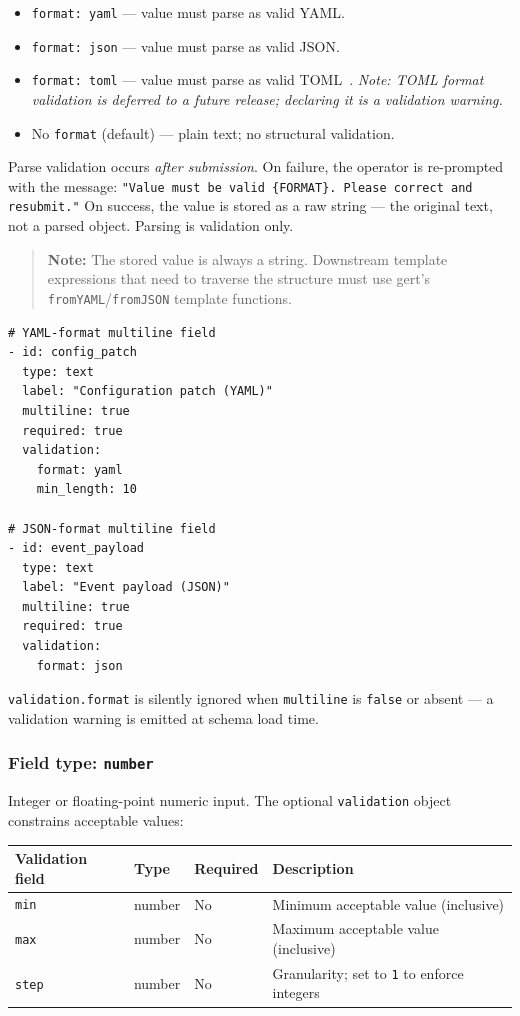 \begin{itemize}
  \item \texttt{format: yaml} — value must parse as valid YAML.
  \item \texttt{format: json} — value must parse as valid JSON.
  \item \texttt{format: toml} — value must parse as valid TOML~.
        \emph{Note: TOML format validation is deferred to a future release;
        declaring it is a validation warning.}
  \item No \texttt{format} (default) — plain text; no structural validation.
\end{itemize}

Parse validation occurs \emph{after submission}.  On failure, the operator
is re-prompted with the message:
\texttt{"Value must be valid \{FORMAT\}.  Please correct and resubmit."}
On success, the value is stored as a raw string — the original text, not a
parsed object.  Parsing is validation only.

\begin{quote}
\textbf{Note:} The stored value is always a string.  Downstream template
expressions that need to traverse the structure must use gert's
\texttt{fromYAML}/\texttt{fromJSON} template functions.
\end{quote}

\begin{verbatim}
# YAML-format multiline field
- id: config_patch
  type: text
  label: "Configuration patch (YAML)"
  multiline: true
  required: true
  validation:
    format: yaml
    min_length: 10

# JSON-format multiline field
- id: event_payload
  type: text
  label: "Event payload (JSON)"
  multiline: true
  required: true
  validation:
    format: json
\end{verbatim}

\texttt{validation.format} is silently ignored when \texttt{multiline} is
\texttt{false} or absent — a validation warning is emitted at schema load
time.

\subsubsection{Field type: \texttt{number}}
\label{subsubsec:field-number}

Integer or floating-point numeric input.  The optional \texttt{validation}
object constrains acceptable values:

\begin{center}
\begin{tabular}{lllp{5cm}}
\hline
\textbf{Validation field} & \textbf{Type} & \textbf{Required} & \textbf{Description} \\
\hline
\texttt{min}  & number  & No & Minimum acceptable value (inclusive) \\
\texttt{max}  & number  & No & Maximum acceptable value (inclusive) \\
\texttt{step} & number  & No & Granularity; set to \texttt{1} to enforce integers \\
\hline
\end{tabular}
\end{center}

